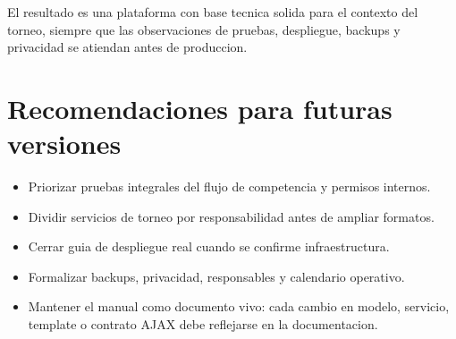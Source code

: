 El resultado es una plataforma con base tecnica solida para el contexto del torneo, siempre que las observaciones de pruebas, despliegue, backups y privacidad se atiendan antes de produccion.

\section{Recomendaciones para futuras versiones}
\label{sec:conclusiones-recomendaciones}

\begin{itemize}
  \item Priorizar pruebas integrales del flujo de competencia y permisos internos.
  \item Dividir servicios de torneo por responsabilidad antes de ampliar formatos.
  \item Cerrar guia de despliegue real cuando se confirme infraestructura.
  \item Formalizar backups, privacidad, responsables y calendario operativo.
  \item Mantener el manual como documento vivo: cada cambio en modelo, servicio, template o contrato AJAX debe reflejarse en la documentacion.
\end{itemize}

